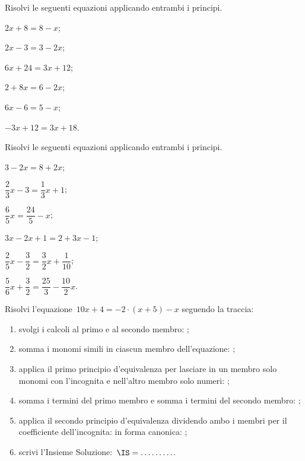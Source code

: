 \begin{esercizio}
\label{ese:13.10}
Risolvi le seguenti equazioni applicando entrambi i principi.
\begin{multicols}{3}
\begin{enumeratea}
\spazielenx
 \item $2x+8=8-x$;
 \item $2x-3=3-2x$;
 \item $6x+24=3x+12$;
 \item $2+8x=6-2x$;
 \item $6x-6=5-x$;
 \item $-3x+12=3x+18$.
\end{enumeratea}
\end{multicols}
\end{esercizio}

\begin{esercizio}
\label{ese:13.11}
Risolvi le seguenti equazioni applicando entrambi i principi.
\begin{multicols}{3}
\begin{enumeratea}
\spazielenx
 \item $3-2x=8+2x$;
 \item $\dfrac{2}{3}x-3=\dfrac{1}{3}x+1$;
 \item $\dfrac{6}{5}x=\dfrac{24}{5}-x$;
 \item $3x-2x+1=2+3x-1$;
 \item $\dfrac{2}{5}x-\dfrac{3}{2}=\dfrac{3}{2}x+\dfrac{1}{10}$;
 \item $\dfrac{5}{6}x+\dfrac{3}{2}=\dfrac{25}{3}-\dfrac{10}{2}x$.
\end{enumeratea}
\end{multicols}
\end{esercizio}


\begin{esercizio}
\label{ese:13.12}
Risolvi l'equazione~$10x+4=-2\cdot (x+5)-x$ seguendo la traccia:
\begin{enumerate}
\spazielenx
 \item svolgi i calcoli al primo e al secondo membro: \dotfill;
 \item somma i monomi simili in ciascun membro dell'equazione: \dotfill;
 \item applica il primo principio d'equivalenza per lasciare in un membro solo monomi con l'incognita e nell'altro membro solo numeri: \dotfill;
 \item somma i termini del primo membro e somma i termini del secondo membro: \dotfill;
 \item applica il secondo principio d'equivalenza dividendo ambo i membri per il coefficiente dell'incognita: \dotfill in forma canonica: \dotfill;
 \item scrivi l'Insieme Soluzione:~$\IS = \ldots \ldots \ldots$.
\end{enumerate}
\end{esercizio}

